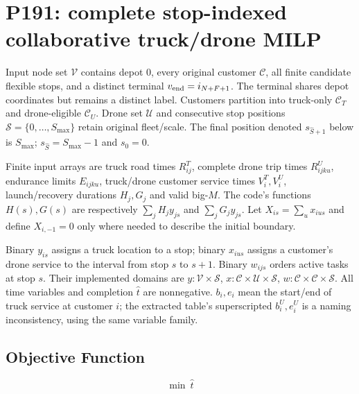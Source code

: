 \documentclass[11pt]{article}
\begin{document}
\section*{P191: complete stop-indexed collaborative truck/drone MILP}
Input node set $\mathcal V$ contains depot $0$, every original customer
$\mathcal C$, all finite candidate flexible stops, and a distinct terminal
$v_{\rm end}=i_{N+F+1}$. The terminal shares depot coordinates but remains
a distinct label. Customers partition into truck-only $\mathcal C_T$ and
drone-eligible $\mathcal C_U$.
Drone set $\mathcal U$ and consecutive stop positions
$\mathcal S=\{0,\ldots,S_{\max}\}$ retain original fleet/scale.
The final position denoted $s_{\hat S+1}$ below is $S_{\max}$;
$s_{\hat S}=S_{\max}-1$ and $s_0=0$.

Finite input arrays are truck road times $R^T_{ij}$, complete drone trip
times $R^U_{ijku}$, endurance limits $E_{ijku}$,
truck/drone customer service times $V^T_i,V^U_i$,
launch/recovery durations $H_j,G_j$ and valid big-$M$.
The code's functions $H(s),G(s)$ are respectively
$\sum_j H_jy_{js}$ and $\sum_jG_jy_{js}$.
Let $X_{is}=\sum_u x_{ius}$ and define $X_{i,-1}=0$ only where needed
to describe the initial boundary.

Binary $y_{is}$ assigns a truck location to a stop;
binary $x_{ius}$ assigns a customer's drone service to the interval
from stop $s$ to $s+1$. Binary $w_{ijs}$ orders active tasks at stop $s$.
Their implemented domains are $y:\mathcal V\times\mathcal S$,
$x:\mathcal C\times\mathcal U\times\mathcal S$,
$w:\mathcal C\times\mathcal C\times\mathcal S$.
All time variables and completion $\hat t$ are nonnegative.
$b_i,e_i$ mean the start/end of truck service at customer $i$;
the extracted table's superscripted $b_i^U,e_i^U$ is a naming inconsistency,
using the same variable family.
\subsection*{Objective Function}
\[\min\ \hat t\]
\end{document}

